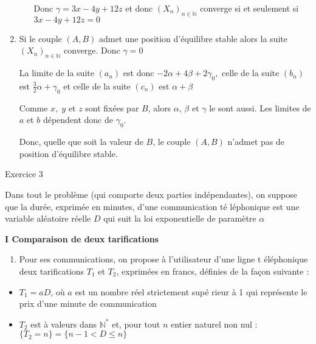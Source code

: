 \documentclass[a4paper, 11pt,reqno]{article}
\begin{document}
\begin{enumerate}
\begin{enumerate}
Donc $\gamma =3x-4y+12z$ et donc $\left( X_{n}\right) _{n\in \mathbb{N}}$
converge si et seulement si $3x-4y+12z=0$
\end{enumerate}

\item Si le couple $(A,B)$ admet une position d'\'{e}quilibre stable alors
la suite $\left( X_{n}\right) _{n\in \mathbb{N}}$ converge. Donc $\gamma =0$

La limite de la suite $\left( a_{n}\right) $ est donc $-2\alpha +4\beta
+2\gamma _{0},$ celle de la suite $\left( b_{n}\right) $ est $\frac{3}{2}%
\alpha +\gamma _{0}$ et celle de la suite $\left( c_{n}\right) $ est $\alpha
+\beta $

Comme $x,\;y$ et $z$ sont fix\'{e}es par $B$, alors $\alpha $, $\beta $ et $%
\gamma $ le sont aussi. Les limites de $a$ et $b$ d\'{e}pendent donc de $%
\gamma _{0}.$

Donc, quelle que soit la valeur de $B$, le couple $\left( A,B\right) $
n'admet pas de position d'\'{e}quilibre stable.
\end{enumerate}

\begin{center}
{\Large Exercice 3}
\end{center}

Dans tout le probl\`{e}me (qui comporte deux parties ind\'{e}pendantes), on
suppose que la dur\'{e}e, exprim\'{e}e en minutes, d'une communication t\'{e}%
l\'{e}phonique est une variable al\'{e}atoire r\'{e}elle $D$ qui suit la loi
exponentielle de param\`{e}tre $\alpha $

\textbf{I Comparaison de deux tarifications}

\begin{enumerate}
\item Pour ses communications, on propose \`{a} l'utilisateur d'une ligne t%
\'{e}l\'{e}phonique deux tarifications $T_{1}$ et $T_{2}$, exprim\'{e}es en
francs, d\'{e}finies de la fa\c{c}on suivante :
\end{enumerate}

\begin{itemize}
\item $T_{1}=aD$, o\`{u} $a$ est un nombre r\'{e}el strictement sup\'{e}%
rieur \`{a} 1 qui repr\'{e}sente le prix d'une minute de communication

\item $T_{2}$ est \`{a} valeurs dans $\mathbb{N}^{*}$ et, pour tout $n$
entier naturel non nul : $\{T_{2}=n\}=\{n-1<D\le n\}$
\end{itemize}
\end{document}
